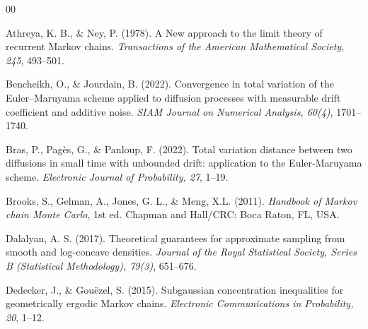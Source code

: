 \documentclass[11pt]{elsarticle}
\begin{document}
\begin{thebibliography}{00}
%

	
	 Athreya, K. B., \& Ney, P. (1978). A New approach to the limit theory of recurrent Markov chains. \textit{Transactions of the American Mathematical Society, 245}, 493--501.
	
	 Bencheikh, O., \& Jourdain, B. (2022). Convergence in total variation of the Euler--Maruyama scheme applied to diffusion processes with measurable drift coefficient and additive noise. \textit{SIAM Journal on Numerical Analysis, 60(4)}, 1701--1740. 
	
	 Bras, P., Pag\`{e}s, G., \& Panloup, F. (2022). Total variation distance between two diffusions in small time with unbounded drift: application to the Euler-Maruyama scheme. \textit{Electronic Journal of Probability, 27}, 1--19.
	
	 Brooks, S., Gelman, A., Jones, G. L., \& Meng, X.L. (2011). \textit{Handbook of Markov chain Monte Carlo}, 1st ed. Chapman and Hall/CRC: Boca Raton, FL, USA.
	
	 Dalalyan, A. S. (2017). Theoretical guarantees for approximate sampling from smooth and log-concave densities. \textit{Journal of the Royal Statistical Society, Series B (Statistical Methodology), 79(3)}, 651--676. 
	
	 Dedecker, J., \& Gou\"{e}zel, S. (2015). Subgaussian concentration inequalities for geometrically ergodic Markov chains. \textit{Electronic Communications in Probability, 20}, 1--12. 
	

\end{thebibliography}
\end{document}
